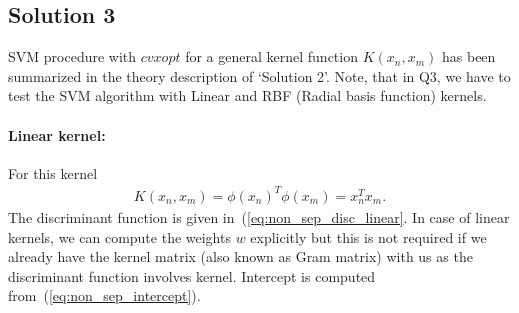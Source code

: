 \subsection*{Solution 3}
SVM procedure with $cvxopt$ for a general kernel function $K(x_n,x_m)$ has been summarized in the theory description of `Solution 2'. Note, that in Q3, we have to test the SVM algorithm with Linear and RBF (Radial basis function) kernels.
\paragraph{Linear kernel:} For this kernel
\begin{align*}
	K(x_n, x_m) = \phi(x_n)^T\phi(x_m) = x_n^Tx_m.
\end{align*}
The discriminant function is given in~(\ref{eq:non_sep_disc_linear}. In case of linear kernels, we can compute the weights $w$ explicitly but this is not required if we already have the kernel matrix (also known as Gram matrix) with us as the discriminant function involves kernel. Intercept is computed from~(\ref{eq:non_sep_intercept}).
